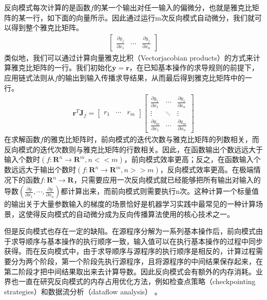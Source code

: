\documentclass[letterpaper,10pt,english]{sphinxmanual}
\begin{document}
\sphinxAtStartPar
反向模式每次计算的是函数\(f\)的某一个输出对任一输入的偏微分，也就是雅克比矩阵的某一行，如下面的向量所示。因此通过运行m次反向模式自动微分，我们就可以得到整个雅克比矩阵。
\begin{equation}\label{equation:chapter_frontend_and_ir/ad:chapter_frontend_and_ir/ad:10}
\begin{split}\begin{bmatrix}
    \frac{\partial y_j}{\partial x_1} & \cdots & \frac{\partial y_j}{\partial x_n}
\end{bmatrix}\end{split}
\end{equation}
\sphinxAtStartPar
类似地，我们可以通过计算向量雅克比积（Vector\sphinxhyphen{}jacobian
products）的方式来计算雅克比矩阵的一行。我们初始化\(\bar{\mathbf{y}}=\mathbf{r}\)，在已知基本操作的求导规则的前提下，应用链式法则从\(f\)的输出到输入传播求导结果，从而最后得到雅克比矩阵中的一行。
\begin{equation}\label{equation:chapter_frontend_and_ir/ad:chapter_frontend_and_ir/ad:11}
\begin{split}\mathbf{r}^{T}\mathbf{J}_{f}=
\begin{bmatrix}
    r_1 & \cdots & r_m
\end{bmatrix}
\begin{bmatrix}
    \frac{\partial y_1}{\partial x_1} & \cdots & \frac{\partial y_1}{\partial x_n} \\
    \vdots & \ddots & \vdots \\
    \frac{\partial y_m}{\partial x_1} & \cdots & \frac{\partial y_m}{\partial x_n}
\end{bmatrix}\end{split}
\end{equation}
\sphinxAtStartPar
在求解函数\(f\)的雅克比矩阵时，前向模式的迭代次数与雅克比矩阵的列数相关，而反向模式的迭代次数则与雅克比矩阵的行数相关。因此，在函数输出个数远远大于输入个数时\((f:{\mathbf{R}^n}\to \mathbf{R}^m, n << m)\)，前向模式效率更高；反之，在函数输入个数远远大于输出个数时\((f:{\mathbf{R}^n}\to \mathbf{R}^m, n >> m)\)，反向模式效率更高。在极端情况下的函数\(f:{\mathbf{R}^n}\to \mathbf{R}\)，只需要应用一次反向模式就已经能够把所有输出对输入的导数\((\frac{\partial y}{\partial x_1},\cdots,\frac{\partial y}{\partial x_n})\)都计算出来，而前向模式则需要执行n次。这种计算一个标量值的输出关于大量参数输入的梯度的场景恰好是机器学习实践中最常见的一种计算场景，这使得反向模式的自动微分成为反向传播算法使用的核心技术之一。

\sphinxAtStartPar
但是反向模式也存在一定的缺陷。在源程序分解为一系列基本操作后，前向模式由于求导顺序与基本操作的执行顺序一致，输入值可以在执行基本操作的过程中同步获得。而在反向模式中，由于求导顺序与源程序的执行顺序是相反的，计算过程需要分为两个阶段，第一个阶段先执行源程序，且将源程序的中间结果保存起来，在第二阶段才把中间结果取出来去计算导数。因此反向模式会有额外的内存消耗。业界也一直在研究反向模式的内存占用优化方法，例如检查点策略（checkpointing
strategies）和数据流分析（data\sphinxhyphen{}flow analysis）
 。
\end{document}
